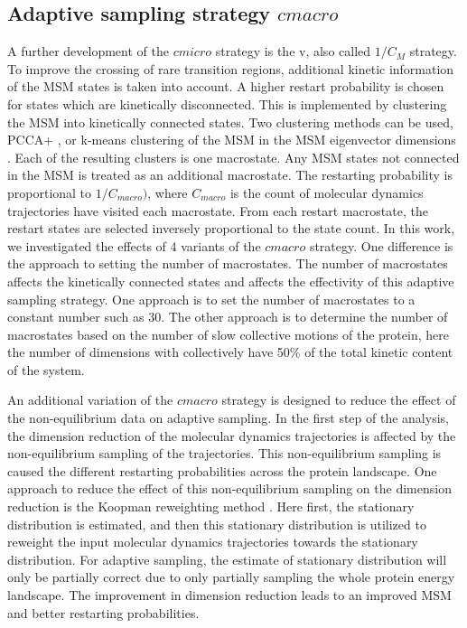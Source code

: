 \subsection{\label{sec:macro}Adaptive sampling strategy $cmacro$} 
A further development of the $cmicro$ strategy is the v, also called $1/C_M$ strategy.
To improve the crossing of rare transition regions, additional kinetic information of the MSM states is taken into account. 
A higher restart probability is chosen for states which are kinetically disconnected. This is implemented by clustering the MSM into kinetically connected states. Two clustering methods can be used, 
PCCA+ \cite{roblitz2013fuzzy}, or k-means clustering of the MSM in the MSM eigenvector dimensions \cite{preto2014fast, doerr2016htmd}. Each of the resulting clusters is one macrostate.
Any MSM states not connected in the MSM is treated as an additional macrostate. 
The restarting probability is proportional to $1/C_{macro})$, where $C_{macro}$ is the count of molecular dynamics trajectories have visited each macrostate. From each restart macrostate, the restart states are selected inversely proportional to the state count.
In this work, we investigated the effects of 4 variants of the $cmacro$ strategy. One difference is the approach to setting the number of macrostates. The number of macrostates affects the kinetically connected states and affects the effectivity of this adaptive sampling strategy. 
One approach is to set the number of macrostates to a constant number such as 30. The other approach is to determine the number of macrostates based on the number of
slow collective motions of the protein, here the number of dimensions with collectively have 50\% of the total kinetic content of the system. 

An additional variation of the $cmacro$ strategy is designed to reduce the effect of the non-equilibrium data on adaptive sampling. In the first step of the analysis, the dimension reduction of the molecular dynamics trajectories is affected by the non-equilibrium sampling of the trajectories. This non-equilibrium sampling is caused the different restarting probabilities across the protein landscape. One approach to reduce the effect of this non-equilibrium sampling on the dimension reduction is the Koopman reweighting method
\cite{koopmanold, koopman2,koopman3,koopman4, wu2017variational, Nueske2017}. Here first, the stationary distribution is estimated, and then this stationary distribution is utilized to reweight the input molecular dynamics trajectories towards the stationary distribution. For adaptive sampling, the estimate of stationary distribution will only be partially correct due to only partially sampling the whole protein energy landscape. The improvement in dimension reduction leads to an improved MSM and better restarting probabilities. 

